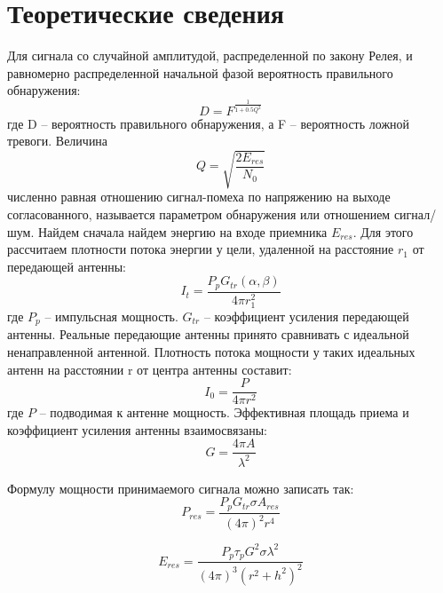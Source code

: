 \chapter{Теоретические сведения}
\label{cha:impl}
Для сигнала со случайной амплитудой, распределенной по закону Релея, и 
равномерно распределенной начальной фазой вероятность правильного обнаружения: 
$$ D = F^{\frac{1}{1 + 0.5 Q^2}} $$
где D – вероятность правильного обнаружения, а F – вероятность ложной тревоги. 
Величина 
$$ Q = \sqrt{\frac{2E_{res}}{N_0}} $$
численно равная отношению сигнал-помеха по напряжению на выходе согласованного, 
называется параметром обнаружения или отношением сигнал/шум. 
Найдем сначала найдем энергию на входе приемника $E_{res}$. Для этого рассчитаем 
плотности потока энергии у цели, удаленной на расстояние $r_1$ от передающей антенны: 
$$ I_t = \frac{P_p G_{tr}(\alpha, \beta) }{4 \pi r_{1}^2} $$
где $P_p$ – импульсная мощность. $G_{tr}$ – коэффициент усиления передающей антенны. 
Реальные передающие антенны принято сравнивать с идеальной ненаправленной 
антенной. Плотность потока мощности у таких идеальных антенн на расстоянии r от центра 
антенны составит:
$$I_0 = \frac{P}{4 \pi r^2}$$
где $P$ – подводимая к антенне мощность.
Эффективная площадь приема 
и коэффициент усиления антенны взаимосвязаны: 
$$G = \frac{4 \pi A}{\lambda^2}$$

Формулу мощности принимаемого сигнала 
можно записать так: 
$$ P_{res} = \frac{P_p G_{tr} \sigma A_{res} }{(4 \pi)^2 r^4} $$

$$ E_{res} = \frac{P_p \tau_p G^2 \sigma \lambda^2 }{(4 \pi)^3 (r^2 + h^2)^2} $$